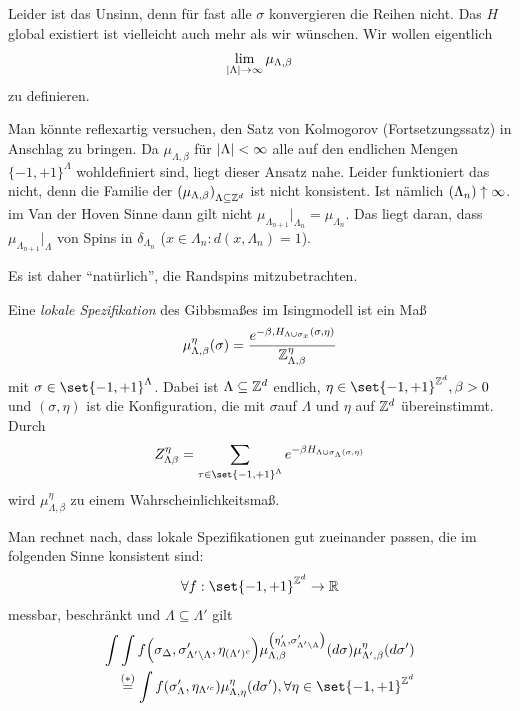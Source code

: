 Leider ist das Unsinn, denn für fast alle $\sigma$ konvergieren die Reihen nicht.  Das $H$ global existiert ist vielleicht auch mehr als wir wünschen. Wir wollen eigentlich 
\begin{align}
	\lim\limits_{\lvert\Lambda\rvert \to \infty} \mu_{\Lambda,\beta}
\end{align} 
zu definieren.

Man könnte reflexartig versuchen, den Satz von Kolmogorov (Fortsetzungssatz) in Anschlag zu bringen. Da $\mu_{\Lambda, \beta}$ für $\lvert\Lambda\rvert < \infty$ alle auf den endlichen Mengen $\{-1,+1\}^{\Lambda}$ wohldefiniert sind, liegt dieser Ansatz nahe. Leider funktioniert das nicht, denn die Familie der $\left(\mu_{\Lambda, \beta}\right)_{\Lambda \subseteq \mathbb{Z}^d}$ ist nicht konsistent. Ist nämlich $\left(\Lambda_n\right) \uparrow \infty$. im Van der Hoven Sinne dann gilt nicht $\mu_{\Lambda_{n+1}}|_{\Lambda_n} = \mu_{\Lambda_n}$. Das liegt daran, dass $\mu_{\Lambda_{n+1}}|_{\Lambda}$ von Spins in $\delta_{\Lambda_n}$ ($x \in \Lambda_{n} : d(x,\Lambda_n) = 1$).

Es ist daher \enquote{natürlich}, die Randspins mitzubetrachten.

\begin{definition}
	Eine \emph{lokale Spezifikation} des Gibbsmaßes im Isingmodell ist ein Maß
	\begin{align}
		\mu^{\eta}_{\Lambda, \beta} (\sigma) = \frac{e^{-\beta, H_{\Lambda \cup \sigma_x}(\sigma, \eta)}}{\mathbb{Z}^\eta_{\Lambda, \beta}}
	\end{align}
	mit $\sigma \in \set{-1,+1}^{\Lambda}$. Dabei ist $\Lambda \subseteq \mathbb{Z}^d$ endlich, $\eta \in \set{-1,+1}^{\ZZ^d} , \beta > 0$ und $(\sigma, \eta)$ ist die Konfiguration, die mit $\sigma$auf $\Lambda$ und $\eta$ auf $\mathbb{Z}^d$ übereinstimmt. Durch 
	\begin{align}
		Z^{\eta}_{\Lambda \beta} = \sum\limits_{\tau \in \set{-1,+1}^{\Lambda}} e^{- \beta H_{\Lambda \cup \sigma_{\Lambda} (\sigma, \eta) }}
	\end{align}
	wird $\mu^{\eta}_{\Lambda, \beta}$ zu einem Wahrscheinlichkeitsmaß.
\end{definition}

	Man rechnet nach, dass lokale Spezifikationen gut zueinander passen, die im folgenden Sinne konsistent sind:
	\begin{align}
		\forall f: \set{-1,+1}^{\ZZ^d} \to \RR
	\end{align}
	messbar, beschränkt und $\Lambda \subseteq \Lambda'$ gilt
	\begin{align}
		\int \int f\enb{\sigma_\Delta, \sigma'_{\Lambda' \backslash \Lambda}, \eta_{(\Lambda')^c}} \mu^{\enb{\eta'_{\Lambda}, \sigma'_{\Lambda' \backslash \Lambda}  }}_{\Lambda,\beta} (d\sigma) \mu^{\eta}_{\Lambda',\beta} (d\sigma') \\
		\overset{(*)}{=} \int f \enb{\sigma'_{\Lambda}, \eta_{\Lambda'^c }} \mu^{\eta}_{\Lambda, \eta} (d\sigma'), \forall \eta \in \set{-1,+1}^{\ZZ^d} 
	\end{align}
	
